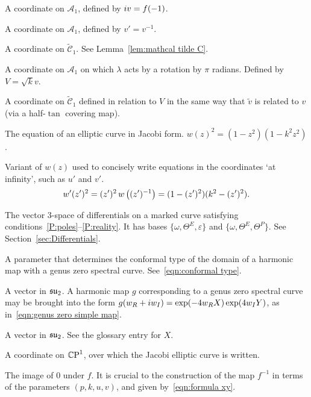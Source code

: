 \begin{description}[align=right]
\item[$v$] A coordinate on $\mathcal{A}_1$, defined by $i v = f(-1)$.

\item[$v'$] A coordinate on $\mathcal{A}_1$, defined by $v' = v^{-1}$.

\item[$\tilde{v}$] A coordinate on $\mathcal{\tilde{C}}_1$. See Lemma~\ref{lem:mathcal tilde C}.

\item[$V$] A coordinate on $\mathcal{A}_1$ on which $λ$ acts by a rotation by $π$ radians. Defined by $V=\sqrt{k} v$.

\item[$\tilde{V}$] A coordinate on $\mathcal{\tilde{C}}_1$ defined in relation to $V$ in the same way that $\tilde{v}$ is related to $v$ (via a half-$\tan$ covering map).

\item[$w(z)$] The equation of an elliptic curve in Jacobi form. $w(z)^2 = (1-z^2)(1-k^2z^2)$.

\item[$w'(z')$] Variant of $w(z)$ used to concisely write equations in the coordinates `at infinity', such as $u'$ and $v'$.
\[
w'(z')^2 = (z')^2\,w\left((z')^{-1}\right) =  (1-(z')^2)(k^2 - (z')^2).
\]


\item[$W$] The vector $3$-space of differentials on a marked curve satisfying conditions~\ref{P:poles}--\ref{P:reality}. It has bases $\{ ω, Θ^E, ε \}$ and $\{ ω, Θ^E, Θ^P \}$. See Section~\ref{sec:Differentials}.

\item[$x$] A parameter that determines the conformal type of the domain of a harmonic map with a genus zero spectral curve. See~\eqref{eqn:conformal type}.

\item[$X$] A vector in $\mathfrak{su}_2$. A harmonic map $g$ corresponding to a genus zero spectral curve may be brought into the form $g(w_R + i w_I) = \exp (-4w_R X) \exp (4w_I Y)$, as in~\eqref{eqn:genus zero simple map}.

\item[$Y$] A vector in $\mathfrak{su}_2$. See the glossary entry for $X$.

\item[$z$] A coordinate on $\CP^1$, over which the Jacobi elliptic curve is written.

\item[$z_0$] The image of $0$ under $f$. It is crucial to the construction of the map $f^{-1}$ in terms of the parameters $(p,k,u,v)$, and given by~\eqref{eqn:formula xy}.







\end{description}
